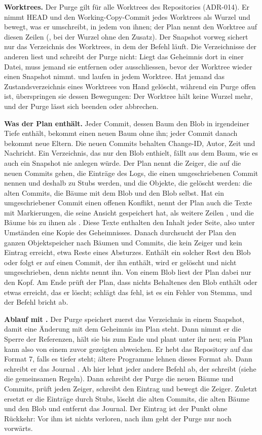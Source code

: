 {\bf Worktrees.} Der Purge gilt für alle Worktrees des Repositories (ADR-014). Er nimmt HEAD und
den Working-Copy-Commit jedes Worktrees als Wurzel und bewegt, was er umschreibt, in jedem von
ihnen; der Plan nennt den Worktree auf diesen Zeilen (,
bei der Wurzel ohne den Zusatz). Der Snapshot vorweg sichert nur das Verzeichnis des Worktrees,
in dem der Befehl läuft. Die Verzeichnisse der anderen liest und schreibt der Purge nicht: Liegt
das Geheimnis dort in einer Datei, muss jemand sie entfernen oder ausschliessen, bevor der
Worktree wieder einen Snapshot nimmt.  und  laufen in jedem
Worktree. Hat jemand das Zustandsverzeichnis eines Worktrees von Hand gelöscht, während ein Purge
offen ist, überspringen sie dessen Bewegungen: Der Worktree hält keine Wurzel mehr, und der Purge
lässt sich beenden oder abbrechen.

{\bf Was der Plan enthält.} Jeder Commit, dessen Baum den Blob in irgendeiner Tiefe enthält,
bekommt einen neuen Baum ohne ihn; jeder Commit danach bekommt neue Eltern. Die neuen
Commits behalten Change-ID, Autor, Zeit und Nachricht. Ein Verzeichnis, das nur den Blob
enthielt, fällt aus dem Baum, wie es auch ein Snapshot nie anlegen würde.
Der Plan nennt die Zeiger, die auf die neuen Commits gehen, die Einträge des Logs, die
einen umgeschriebenen Commit nennen und deshalb zu Stubs werden, und die Objekte, die
gelöscht werden: die alten Commits, die Bäume mit dem Blob und den Blob selbst.
Hat ein umgeschriebener Commit einen offenen Konflikt, nennt der Plan auch die Texte mit
Markierungen, die seine Ansicht gespeichert hat, als weitere Zeilen ,
und die Bäume bis zu ihnen als . Diese Texte enthalten den Inhalt jeder Seite,
also unter Umständen eine Kopie des Geheimnisses.
Danach durchsucht der Plan den ganzen Objektspeicher nach Bäumen und Commits, die
kein Zeiger und kein Eintrag erreicht, etwa Reste eines Absturzes. Enthält ein solcher Rest
den Blob oder folgt er auf einen Commit, der ihn enthält, wird er gelöscht und nicht
umgeschrieben, denn nichts nennt ihn. Von einem Blob liest der Plan dabei nur den Kopf.
Am Ende prüft der Plan, dass nichts Behaltenes den Blob enthält oder etwas erreicht, das er
löscht; schlägt das fehl, ist es ein Fehler von Stemma, und der Befehl bricht ab.

{\bf Ablauf mit .} Der Purge speichert zuerst das Verzeichnis in einem
Snapshot, damit eine Änderung mit dem Geheimnis im Plan steht. Dann nimmt er die Sperre der
Referenzen, hält sie bis zum Ende und plant unter ihr neu; sein Plan kann also von einem
zuvor gezeigten abweichen. Er hebt das Repository auf das Format 7, falls es tiefer steht;
ältere Programme lehnen dieses Format ab. Dann schreibt er das Journal
. Ab hier lehnt jeder andere Befehl ab, der schreibt (siehe die
gemeinsamen Regeln). Dann schreibt der Purge die neuen
Bäume und Commits, prüft jeden Zeiger, schreibt den Eintrag  und bewegt die
Zeiger. Zuletzt ersetzt er die Einträge durch Stubs, löscht die alten Commits, die alten
Bäume und den Blob und entfernt das Journal. Der Eintrag  ist der Punkt ohne
Rückkehr: Vor ihm ist nichts verloren, nach ihm geht der Purge nur noch vorwärts.

